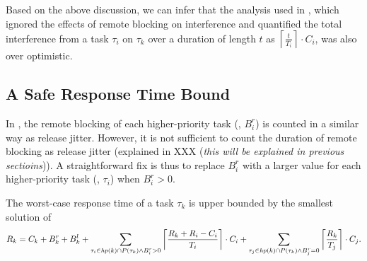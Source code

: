Based on the above discussion, we can infer that the analysis used in \cite{NBN:11}, which ignored the effects of remote blocking on interference and quantified the total interference from a task $\tau_i$ on $\tau_k$ over a duration of length $t$ as $\left \lceil \frac{t}{T_i} \right \rceil \cdot C_i$, was also over optimistic. 

\subsection{A Safe Response Time Bound}
\label{sec:safe_bound}

In , the remote blocking of each higher-priority task (\ie, $B_i^r$) is counted in a similar way as release jitter. However, it is not sufficient to count the duration of remote blocking as release jitter (explained in XXX (\emph{this will be explained in previous sectioins})). A straightforward fix is thus to replace $B_i^r$ with a larger value for each higher-priority task (\ie, $\tau_i$) when $B_i^r > 0$.

\begin{lemma}
\label{lem:new_framework}
The worst-case response time of a task $\tau_k$ is upper bounded by the smallest solution of 
\begin{align}
\label{eq:fix}
R_k = C_k + B_k^r + B_k^l + \sum_{\tau_i \in \fun{hp}(k) \cap P(\tau_k) \wedge B_i^r > 0} \left \lceil \frac{R_k + R_i - C_i}{T_i} \right \rceil \cdot C_i
+ \sum_{\tau_j \in \fun{hp}(k) \cap P(\tau_k) \wedge B_j^r = 0} \left \lceil \frac{R_k}{T_j} \right \rceil \cdot C_j.
\end{align}
\end{lemma}



